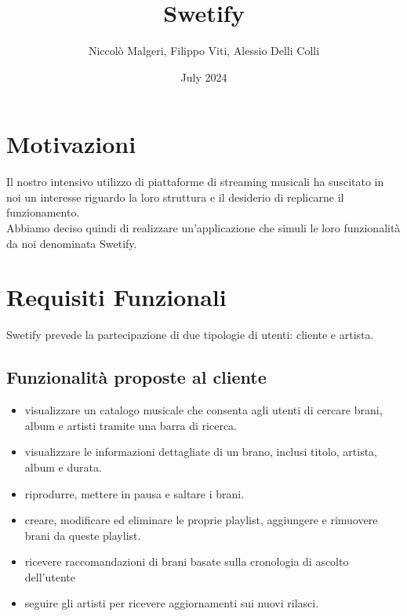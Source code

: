 \documentclass{article}
\title{Swetify}
\author{Niccolò Malgeri, Filippo Viti, Alessio Delli Colli}
\date{July 2024}
\begin{document}
  \maketitle

  \tableofcontents
  \newpage


  \section{Motivazioni}
  Il nostro intensivo utilizzo di piattaforme di streaming musicali ha suscitato in noi un interesse riguardo
  la loro struttura e il desiderio di replicarne il funzionamento.\\
  Abbiamo deciso quindi di realizzare un'applicazione che simuli le loro funzionalità da noi denominata Swetify.


  \section{Requisiti Funzionali}
  Swetify prevede la partecipazione di due tipologie di utenti: cliente e artista.

  \subsection{Funzionalità proposte al cliente}

  \begin{itemize}
    \item
    visualizzare un catalogo musicale che consenta agli utenti di cercare brani, album e artisti tramite una barra
    di ricerca.

    \item
    visualizzare le informazioni dettagliate di un brano, inclusi titolo, artista, album e durata.

    \item
    riprodurre, mettere in pausa e saltare i brani.

    \item
    creare, modificare ed eliminare le proprie playlist, aggiungere e rimuovere brani da queste playlist.

    \item
    ricevere raccomandazioni di brani basate sulla cronologia di ascolto dell'utente

    \item
    seguire gli artisti per ricevere aggiornamenti sui nuovi rilasci.

  \end{itemize}
\end{document}
